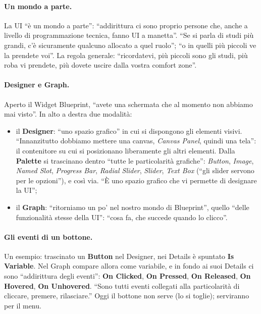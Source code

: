 \paragraph{Un mondo a parte.} La UI ``è un mondo a parte'': ``addirittura ci sono proprio
persone che, anche a livello di programmazione tecnica, fanno UI a manetta''. ``Se si
parla di studi più grandi, c'è sicuramente qualcuno allocato a quel ruolo''; ``o in
quelli più piccoli ve la prendete voi''. La regola generale: ``ricordatevi, più piccoli
sono gli studi, più roba vi prendete, più dovete uscire dalla vostra comfort zone''.

\paragraph{Designer e Graph.} Aperto il Widget Blueprint, ``avete una schermata che al
momento non abbiamo mai visto''. In alto a destra due modalità:
\begin{itemize}
  \item il \textbf{Designer}: ``uno spazio grafico'' in cui si dispongono gli elementi
        visivi. ``Innanzitutto dobbiamo mettere una canvas, \emph{Canvas Panel}, quindi
        una tela'': il contenitore su cui si posizionano liberamente gli altri elementi.
        Dalla \textbf{Palette} si trascinano dentro ``tutte le particolarità grafiche'':
        \emph{Button}, \emph{Image}, \emph{Named Slot}, \emph{Progress Bar}, \emph{Radial
        Slider}, \emph{Slider}, \emph{Text Box} (``gli slider servono per le opzioni''),
        e così via. ``È uno spazio grafico che vi permette di designare la UI'';
  \item il \textbf{Graph}: ``ritorniamo un po' nel nostro mondo di Blueprint'', quello
        ``delle funzionalità stesse della UI'': ``cosa fa, che succede quando lo
        clicco''.
\end{itemize}

\paragraph{Gli eventi di un bottone.} Un esempio: trascinato un \textbf{Button} nel
Designer, nei Details è spuntato \textbf{Is Variable}. Nel Graph compare allora come
variabile, e in fondo ai suoi Details ci sono ``addirittura degli eventi'':
\textbf{On Clicked}, \textbf{On Pressed}, \textbf{On Released}, \textbf{On Hovered},
\textbf{On Unhovered}. ``Sono tutti eventi collegati alla particolarità di cliccare,
premere, rilasciare.'' Oggi il bottone non serve (lo si toglie); serviranno per il menu.

